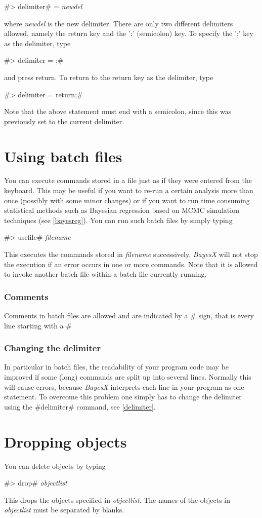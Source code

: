 #> delimiter# = {\em newdel}

where {\em newdel} is the new delimiter. There are only two
different delimiters allowed, namely the
return key and the ';' (semicolon) key. To specify the ';' key as the delimiter, type

#> delimiter = ;#

and press return. To return to the return key as the delimiter, type

#> delimiter = return;#

Note that the above statement must end with a semicolon, since
this was previously set to the current delimiter.


\section{Using batch files}
\label{batch} 

You can execute commands stored in a file just as if they were
entered from the keyboard. This may be useful if you want to
re-run a certain analysis more than once (possibly with some minor
changes) or if you want to run time consuming statistical methods
such as Bayesian regression based on MCMC simulation techniques
(see \autoref{bayesreg}).
You can run such batch files by simply typing

#> usefile# {\em filename}

This executes the commands stored in {\em filename} successively.
{\em BayesX} will not stop the execution if an error occurs in one
or more commands. Note that it is allowed to invoke
another batch file within a batch file currently running.


\subsubsection*{Comments}

Comments in batch files are allowed and are indicated by a  #%
sign, that is every line
starting with a #%

\subsubsection*{Changing the delimiter}

In particular in batch files, the readability of your program code
may be improved if some (long) commands are split up into several
lines. Normally this will cause errors, because {\em BayesX}
interprets each line in your program as one statement. To overcome
this problem one simply
has to change the delimiter using the #delimiter# command, see \autoref{delimiter}.


\section{Dropping objects}
 

You can delete objects by typing

#> drop# {\em objectlist}

This drops the objects specified in {\em objectlist}. The names of
the objects in {\em objectlist} must be separated by blanks.
